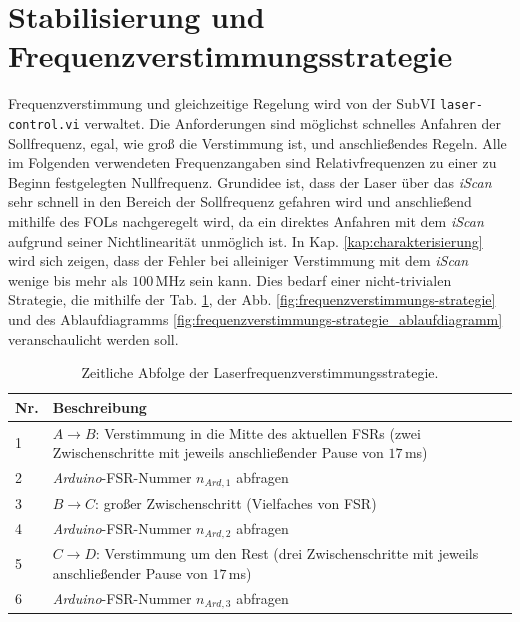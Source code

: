 \section{Stabilisierung
und
Frequenzverstimmungsstrategie}\label{sec:stabilisierung_frequenzverstimmungs-strategie}
Frequenzverstimmung und gleichzeitige Regelung wird von der SubVI \lstinline|laser-control.vi| verwaltet. Die Anforderungen sind möglichst schnelles Anfahren der Sollfrequenz, egal, wie groß die Verstimmung ist, und
anschließendes Regeln. Alle im Folgenden verwendeten Frequenzangaben sind
Relativfrequenzen zu einer zu Beginn festgelegten Nullfrequenz. Grundidee ist,
dass der Laser über das \textit{iScan} sehr schnell in den Bereich der
Sollfrequenz gefahren wird und anschließend mithilfe des FOLs nachgeregelt wird,
da ein direktes Anfahren mit dem \textit{iScan} aufgrund seiner Nichtlinearität unmöglich ist. In Kap. \ref{kap:charakterisierung} wird sich zeigen, dass der Fehler bei
alleiniger Verstimmung mit dem \textit{iScan} wenige bis mehr als $100\,$MHz sein kann.
Dies bedarf einer nicht-trivialen Strategie, die mithilfe der Tab.
\ref{tab:scan-strategie_abfolge}, der Abb.
\ref{fig:frequenzverstimmungs-strategie} und des Ablaufdiagramms
\ref{fig:frequenzverstimmungs-strategie_ablaufdiagramm} veranschaulicht werden
soll.\par
\begin{table}
	\begin{tabular}{p{}p{}}
		\toprule
			Nr. & Beschreibung \\
		\midrule[1px]
		\hline
			1 & $A\rightarrow B$: Verstimmung in die Mitte des aktuellen FSRs (zwei
			Zwischenschritte mit jeweils anschließender Pause von $17\,$ms)\\
			2 & \textit{Arduino}-FSR-Nummer $n_{Ard,1}$ abfragen\\
			3 & $B\rightarrow C$: großer Zwischenschritt (Vielfaches von FSR)\\
			4 & \textit{Arduino}-FSR-Nummer $n_{Ard,2}$ abfragen\\
			5 & $C\rightarrow D$: Verstimmung um den Rest (drei Zwischenschritte mit
			jeweils anschließender Pause von $17\,$ms)\\
			6 & \textit{Arduino}-FSR-Nummer $n_{Ard,3}$ abfragen\\
		\bottomrule[1px]
	\end{tabular}
	\caption[Laserfrequenzverstimmungs-Strategie]{Zeitliche
	Abfolge der Laserfrequenzverstimmungsstrategie.}
	\label{tab:scan-strategie_abfolge}
\end{table}
